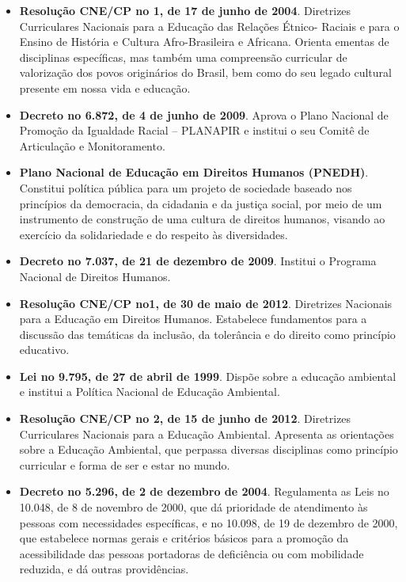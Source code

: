 \begin{itemize}
\item \textbf{Resolução CNE/CP no 1, de 17 de junho de 2004}. Diretrizes Curriculares Nacionais para a Educação das Relações Étnico- Raciais e para o Ensino de História e Cultura Afro-Brasileira e Africana. Orienta ementas de disciplinas específicas, mas também uma compreensão curricular de valorização dos povos originários do Brasil, bem como do seu legado cultural presente em nossa vida e educação.

\item \textbf{Decreto no 6.872, de 4 de junho de 2009}. Aprova o Plano Nacional de Promoção da Igualdade Racial – PLANAPIR e institui o seu Comitê de Articulação e Monitoramento.

\item \textbf{Plano Nacional de Educação em Direitos Humanos (PNEDH)}. Constitui política pública para um projeto de sociedade baseado nos princípios da democracia, da cidadania e da justiça social, por meio de um instrumento de construção de uma cultura de direitos humanos, visando ao exercício da solidariedade e do respeito às diversidades.

\item \textbf{Decreto no 7.037, de 21 de dezembro de 2009}. Institui o Programa Nacional de Direitos Humanos.

\item \textbf{Resolução CNE/CP no1, de 30 de maio de 2012}. Diretrizes Nacionais para a Educação em Direitos Humanos. Estabelece fundamentos para a discussão das temáticas da inclusão, da tolerância e do direito como princípio educativo.

\item \textbf{Lei no 9.795, de 27 de abril de 1999}. Dispõe sobre a educação ambiental e institui a Política Nacional de Educação Ambiental.

\item \textbf{Resolução CNE/CP no 2, de 15 de junho de 2012}. Diretrizes Curriculares Nacionais para a Educação Ambiental. Apresenta as orientações sobre a Educação Ambiental, que perpassa diversas disciplinas como princípio curricular e forma de ser e estar no mundo.

\item \textbf{Decreto no 5.296, de 2 de dezembro de 2004}. Regulamenta as Leis no 10.048, de 8 de novembro de 2000, que dá prioridade de atendimento às pessoas com necessidades específicas, e no 10.098, de 19 de dezembro de 2000, que estabelece normas gerais e critérios básicos para a promoção da acessibilidade das pessoas portadoras de deficiência ou com mobilidade reduzida, e dá outras providências.


\end{itemize}
